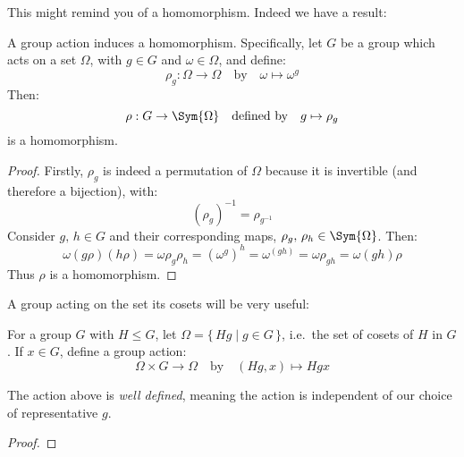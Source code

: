 This might remind you of a homomorphism.
Indeed we have a result:

\begin{lemma}\label{lem:actionhom}
    A group action induces a homomorphism.
    Specifically, let \(G\) be a group which acts on a set \(\Omega\), with \(g \in G\) and \(\omega \in \Omega\), and
    define:
    \[\rho_g:\Omega \to \Omega \quad \text{by} \quad \omega \mapsto \omega^g\]
    Then:
    \[\rho:G \to \Sym{\Omega} \quad \text{defined by} \quad g \mapsto \rho_g\]
    is a homomorphism.
\end{lemma}

\begin{proof}
    Firstly, \(\rho_g\) is indeed a permutation of \(\Omega\) because it is invertible (and therefore a bijection),
    with:
    \[{(\rho_g)}^{-1} = \rho_{g^{-1}}\]
    Consider \(g,\,h \in G\) and their corresponding maps, \(\rho_{g},\,\rho_{h} \in \Sym{\Omega}\).
    Then:
    \[\omega(g\rho)(h\rho) = \omega\rho_g\rho_h = {(\omega^g)}^h = \omega^{(gh)} = \omega\rho_{gh} = \omega(gh)\rho\]
    Thus \(\rho\) is a homomorphism.
\end{proof}

A group acting on the set its cosets will be very useful:

\begin{definition}
    For a group \(G\) with \(H \leqslant G\), let \(\Omega = \{\,Hg \mid g \in G\,\}\), i.e.\ the set of cosets of \(H\)
    in \(G\).
    If \(x \in G\), define a group action:
    \[\Omega \times G \to \Omega \quad \text{by} \quad (Hg, x) \mapsto Hgx\]
\end{definition}

\begin{lemma}
    The action above is \emph{well defined}, meaning the action is independent of our choice of representative \(g\).
\end{lemma}

\begin{proof}
\end{proof}




